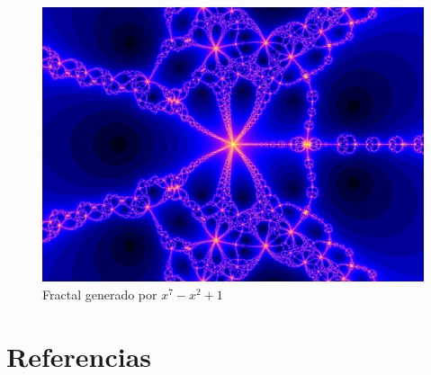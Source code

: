 \begin{figure}[H]
    \centering
    \includegraphics[scale=0.26]{images/ej5.png}
    \caption{Fractal generado por $x^7-x^2+1$}
    \label{fig:ej_5}
\end{figure}

\section{Referencias}

